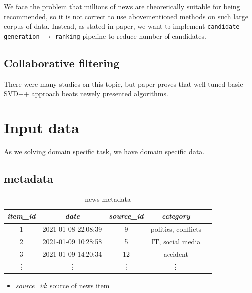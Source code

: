 \documentclass{article}
\begin{document}
We face the problem that millions of news are theoretically suitable for being recommended, so it is not correct to use abovementioned methods on such large corpus of data. Instead, as stated in \citep{youtube} paper, we want to implement \texttt{candidate generation} $\to$ \texttt{ranking} pipeline to reduce number of candidates.



\subsection{Collaborative filtering}

There were many studies on this topic, but paper \citep{evaluation} proves that well-tuned basic SVD++ approach beats newely presented algorithms.



\section{Input data}
\label{sec:input}

As we solving domain specific task, we have domain specific data.

\subsection*{metadata}

\begin{table}[h]
    \centering
    \begin{tabular}{ccccc}
        \toprule

        \emph{item\_id} & \emph{date} & \emph{source\_id} & \emph{category}\\\midrule

        1 & 2021-01-08 22:08:39 & 9  & politics, conflicts\\
        2 & 2021-01-09 10:28:58 & 5  & IT, social media\\
        3 & 2021-01-09 14:20:34 & 12 & accident\\
        \vdots & \vdots & \vdots & \vdots \\\bottomrule


     \hline
    \end{tabular}

    \caption{news metadata}
    \label{tab:meta}
\end{table}


\begin{itemize}
    \item \emph{source\_id}: source of news item
\end{itemize}
\end{document}

